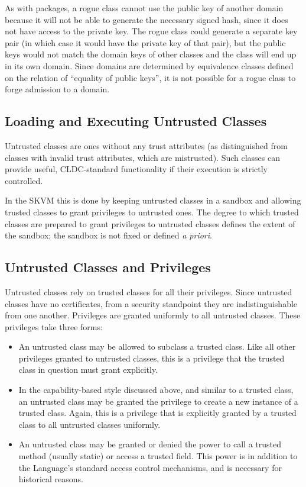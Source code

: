 \documentclass{llncs}
\begin{document}
As with packages, a rogue class cannot use the public key of another
domain because it will not be able to generate the necessary signed
hash, since it does not have access to the private key. The rogue class
could generate a separate key pair (in which case it would have the
private key of that pair), but the public keys would not match the
domain keys of other classes and the class will end up in its own
domain. Since domains are determined by equivalence classes defined on
the relation of ``equality of public keys'', it is not possible for a
rogue class to forge admission to a domain.

\subsection{Loading and Executing Untrusted Classes}

Untrusted classes are ones without any trust attributes (as
distinguished from classes with invalid trust attributes, which are
mistrusted). Such classes can provide useful, CLDC-standard
functionality if their execution is strictly controlled.

In the SKVM this is done by keeping untrusted classes in a sandbox and
allowing trusted classes to grant privileges to untrusted ones. The
degree to which trusted classes are prepared to grant privileges to
untrusted classes defines the extent of the sandbox; the sandbox is not
fixed or defined \emph{a priori}.

\subsection{Untrusted Classes and Privileges}

Untrusted classes rely on trusted classes for all their privileges.
Since untrusted classes have no certificates, from a security standpoint
they are indistinguishable from one another. Privileges are granted
uniformly to all untrusted classes. These privileges take three forms:

\begin{itemize}
  \item An untrusted class may be allowed to subclass a trusted class.
  Like all other privileges granted to untrusted classes, this is a
  privilege that the trusted class in question must grant explicitly.
  \item In the capability-based style discussed above, and similar to a
  trusted class, an untrusted class may be granted the privilege to
  create a new instance of a trusted class. Again, this is a
  privilege that is explicitly granted by a trusted class to all
  untrusted classes uniformly.
  \item An untrusted class may be granted or denied the power to call a
  trusted method (usually static) or access a trusted field. This
  power is in addition to the Language's standard access control
  mechanisms, and is necessary for historical reasons.
\end{itemize}
\end{document}
